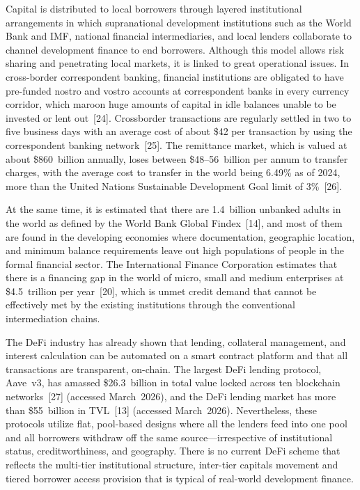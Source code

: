 \documentclass[12pt,a4paper]{report}
\begin{document}
Capital is distributed to local borrowers through layered institutional arrangements in which supranational development institutions such as the World Bank and IMF, national financial intermediaries, and local lenders collaborate to channel development finance to end borrowers. Although this model allows risk sharing and penetrating local markets, it is linked to great operational issues. In cross-border correspondent banking, financial institutions are obligated to have pre-funded nostro and vostro accounts at correspondent banks in every currency corridor, which maroon huge amounts of capital in idle balances unable to be invested or lent out~[24]. Crossborder transactions are regularly settled in two to five business days with an average cost of about \$42 per transaction by using the correspondent banking network~[25]. The remittance market, which is valued at about \$860~billion annually, loses between \$48--56~billion per annum to transfer charges, with the average cost to transfer in the world being 6.49\% as of 2024, more than the United Nations Sustainable Development Goal limit of 3\%~[26].

At the same time, it is estimated that there are 1.4~billion unbanked adults in the world as defined by the World Bank Global Findex~[14], and most of them are found in the developing economies where documentation, geographic location, and minimum balance requirements leave out high populations of people in the formal financial sector. The International Finance Corporation estimates that there is a financing gap in the world of micro, small and medium enterprises at \$4.5~trillion per year~[20], which is unmet credit demand that cannot be effectively met by the existing institutions through the conventional intermediation chains.

The DeFi industry has already shown that lending, collateral management, and interest calculation can be automated on a smart contract platform and that all transactions are transparent, on-chain. The largest DeFi lending protocol, Aave~v3, has amassed \$26.3~billion in total value locked across ten blockchain networks~[27] (accessed March~2026), and the DeFi lending market has more than \$55~billion in TVL~[13] (accessed March~2026). Nevertheless, these protocols utilize flat, pool-based designs where all the lenders feed into one pool and all borrowers withdraw off the same source---irrespective of institutional status, creditworthiness, and geography. There is no current DeFi scheme that reflects the multi-tier institutional structure, inter-tier capitals movement and tiered borrower access provision that is typical of real-world development finance.
\end{document}
